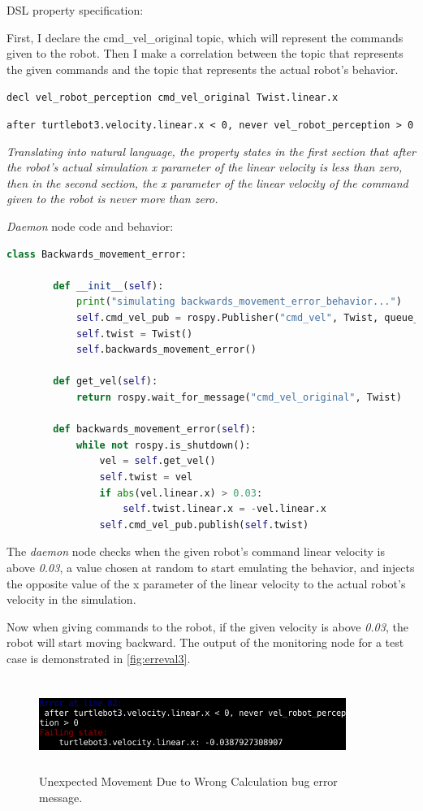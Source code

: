 DSL property specification:

First, I declare the cmd\_vel\_original topic, which will represent the commands given to the robot.
Then I make a correlation between the topic that represents the given commands and the topic that represents the actual robot's behavior.

\texttt{decl vel\_robot\_perception cmd\_vel\_original Twist.linear.x}

\texttt{after turtlebot3.velocity.linear.x < 0, never vel\_robot\_perception > 0}

\textit{Translating into natural language, the property states in the first section that after the robot's actual simulation x parameter of the linear velocity is less than zero, then in the second section, the x parameter of the linear velocity of the command given to the robot is never more than zero.}

\textit{Daemon} node code and behavior:

\begin{lstlisting}[language=Python]
    class Backwards_movement_error:

        def __init__(self):
            print("simulating backwards_movement_error_behavior...")
            self.cmd_vel_pub = rospy.Publisher("cmd_vel", Twist, queue_size=1)
            self.twist = Twist()
            self.backwards_movement_error()

        def get_vel(self):
            return rospy.wait_for_message("cmd_vel_original", Twist)

        def backwards_movement_error(self):
            while not rospy.is_shutdown():
                vel = self.get_vel()
                self.twist = vel
                if abs(vel.linear.x) > 0.03:
                    self.twist.linear.x = -vel.linear.x
                self.cmd_vel_pub.publish(self.twist)
\end{lstlisting}

The \textit{daemon} node checks when the given robot's command linear velocity is above \textit{0.03}, a value chosen at random to start emulating the behavior, and injects the opposite value of the x parameter of the linear velocity to the actual robot's velocity in the simulation.

Now when giving commands to the robot, if the given velocity is above \textit{0.03}, the robot will start moving backward. The output of the monitoring node for a test case is demonstrated in \autoref{fig:erreval3}.

\begin{figure}[htb]
\begin{center}
\includegraphics[width=10cm,height=3cm,keepaspectratio,]{images/erreval3.png}
\caption{Unexpected Movement Due to Wrong Calculation bug error message.} \label{fig:erreval3}
\end{center}
\end{figure}


